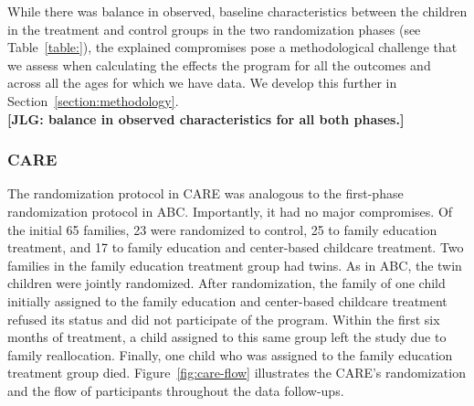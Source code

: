 \noindent While there was balance in observed, baseline characteristics between the children in the treatment and control groups in the two randomization phases (see Table~\ref{table:}), the explained compromises pose a methodological challenge that we assess when calculating the effects the program for all the outcomes and across all the ages for which we have data. We develop this further in Section~\ref{section:methodology}.\\

\noindent \textbf{[JLG: balance in observed characteristics for all both phases.]}\\

\subsubsection{CARE}

\noindent The randomization protocol in CARE was analogous to the first-phase randomization protocol in ABC. Importantly, it had no major compromises. Of the initial 65 families, 23 were randomized to control, 25 to family education treatment, and 17 to family education and center-based childcare treatment. Two families in the family education treatment group had twins. As in ABC, the twin children were jointly randomized. After randomization, the family of one child initially assigned to the family education and center-based childcare treatment refused its status and did not participate of the program. Within the first six months of treatment, a child assigned to this same group left the study due to family reallocation. Finally, one child who was assigned to the family education treatment group died. Figure~\ref{fig:care-flow} illustrates the CARE's randomization and the flow of participants throughout the data follow-ups.\\

